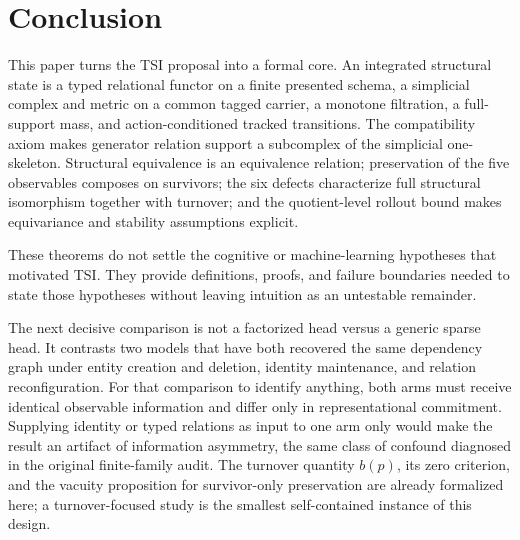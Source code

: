 \section{Conclusion}

This paper turns the TSI proposal into a formal core. An integrated structural
state is a typed relational functor on a finite presented schema, a simplicial
complex and metric on a common tagged carrier, a monotone filtration, a
full-support mass, and action-conditioned tracked transitions. The compatibility
axiom makes generator relation support a subcomplex of the simplicial
one-skeleton. Structural equivalence is an equivalence relation; preservation of
the five observables composes on survivors; the six defects characterize full
structural isomorphism together with turnover; and the quotient-level rollout
bound makes equivariance and stability assumptions explicit.

These theorems do not settle the cognitive or machine-learning hypotheses that
motivated TSI. They provide definitions, proofs, and failure boundaries needed
to state those hypotheses without leaving intuition as an untestable remainder.

The next decisive comparison is not a factorized head versus a generic sparse
head. It contrasts two models that have both recovered the same dependency
graph under entity creation and deletion, identity maintenance, and relation
reconfiguration. For that comparison to identify anything, both arms must
receive identical observable information and differ only in representational
commitment. Supplying identity or typed relations as input to one arm only
would make the result an artifact of information asymmetry, the same class of
confound diagnosed in the original finite-family audit. The turnover quantity
\(b(p)\), its zero criterion, and the vacuity proposition for survivor-only
preservation are already formalized here; a turnover-focused study is the
smallest self-contained instance of this design.
